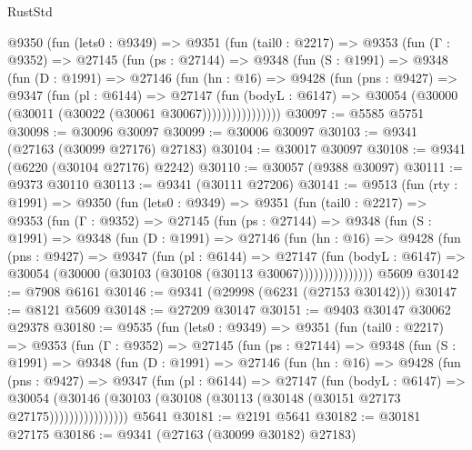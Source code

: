 \begin{lexlean}{RustStd}
\begin{coremodule}
      @9350
        (fun (lets0 : @9349) =>
        @9351
          (fun (tail0 : @2217) =>
          @9353
            (fun (Γ : @9352) =>
            @27145
              (fun (ps : @27144) =>
              @9348
                (fun (S : @1991) =>
                @9348
                  (fun (D : @1991) =>
                  @27146
                    (fun (hn : @16) =>
                    @9428
                      (fun (pns : @9427) =>
                      @9347
                        (fun (pl : @6144) =>
                        @27147
                          (fun (bodyL : @6147) =>
                          @30054 (@30000 (@30011 (@30022 (@30061 @30067))))))))))))))))
@30097 := @5585 @5751
@30098 := @30096 @30097
@30099 := @30006 @30097
@30103 := @9341 (@27163 (@30099 @27176) @27183)
@30104 := @30017 @30097
@30108 := @9341 (@6220 (@30104 @27176) @2242)
@30110 := @30057 (@9388 @30097)
@30111 := @9373 @30110
@30113 := @9341 (@30111 @27206)
@30141 := @9513
    (fun (rty : @1991) =>
    @9350
      (fun (lets0 : @9349) =>
      @9351
        (fun (tail0 : @2217) =>
        @9353
          (fun (Γ : @9352) =>
          @27145
            (fun (ps : @27144) =>
            @9348
              (fun (S : @1991) =>
              @9348
                (fun (D : @1991) =>
                @27146
                  (fun (hn : @16) =>
                  @9428
                    (fun (pns : @9427) =>
                    @9347
                      (fun (pl : @6144) =>
                      @27147
                        (fun (bodyL : @6147) =>
                        @30054 (@30000 (@30103 (@30108 (@30113 @30067)))))))))))))))
    @5609
@30142 := @7908 @6161
@30146 := @9341 (@29998 (@6231 (@27153 @30142)))
@30147 := @8121 @5609
@30148 := @27209 @30147
@30151 := @9403 @30147 @30062 @29378
@30180 := @9535
    (fun (lets0 : @9349) =>
    @9351
      (fun (tail0 : @2217) =>
      @9353
        (fun (Γ : @9352) =>
        @27145
          (fun (ps : @27144) =>
          @9348
            (fun (S : @1991) =>
            @9348
              (fun (D : @1991) =>
              @27146
                (fun (hn : @16) =>
                @9428
                  (fun (pns : @9427) =>
                  @9347
                    (fun (pl : @6144) =>
                    @27147
                      (fun (bodyL : @6147) =>
                      @30054
                        (@30146
                          (@30103 (@30108 (@30113 (@30148 (@30151 @27173 @27175))))))))))))))))
    @5641
@30181 := @2191 @5641
@30182 := @30181 @27175
@30186 := @9341 (@27163 (@30099 @30182) @27183)

\end{coremodule}
\end{lexlean}
